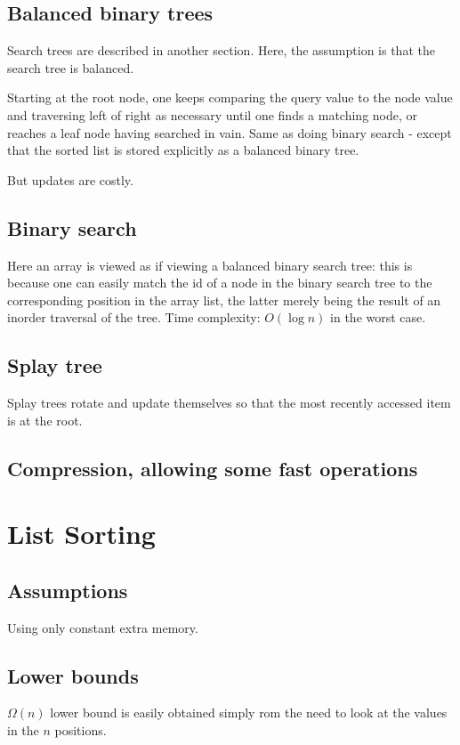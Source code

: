 \documentclass[oneside, article]{memoir}
\begin{document}
\subsection{Balanced binary trees}
Search trees are described in another section. Here, the assumption is that the search tree is balanced.

Starting at the root node, one keeps comparing the query value to the node value and traversing left of right as necessary until one finds a matching node, or reaches a leaf node having searched in vain. Same as doing binary search - except that the sorted list is stored explicitly as a balanced binary tree.

But updates are costly.

\subsection{Binary search}
Here an array is viewed as if viewing a balanced binary search tree: this is because one can easily match the id of a node in the binary search tree to the corresponding position in the array list, the latter merely being the result of an inorder traversal of the tree. Time complexity: $O(\log n)$ in the worst case.

\subsection{Splay tree}
Splay trees rotate and update themselves so that the most recently accessed item is at the root.

\subsection{Compression, allowing some fast operations}
\tbc

\section{List Sorting}
\subsection{Assumptions}
Using only constant extra memory.

\subsection{Lower bounds}
$\Omega(n)$ lower bound is easily obtained simply rom the need to look at the values in the $n$ positions.
\end{document}
